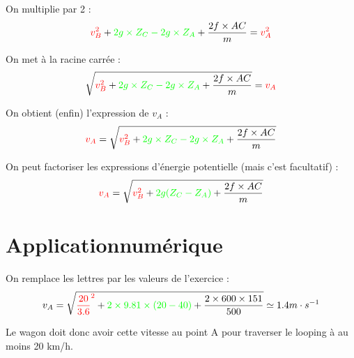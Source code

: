 \documentclass[a4paper,twoside,10pt,french]{scrartcl}
\begin{document}
On multiplie par 2 : $${\color{red}v_B^2} + {\color{green}2g \times Z_C - 2g \times Z_A} + \frac{2f \times AC}{m} = {\color{red}v_A^2}$$

On met à la racine carrée : $$\sqrt{{\color{red}v_B^2} + {\color{green}2g \times Z_C - 2g \times Z_A} + \frac{2f \times AC}{m}} = {\color{red}v_A}$$

On obtient (enfin) l'expression de $v_A$ : $${\color{red}v_A} = \sqrt{{\color{red}v_B^2} + {\color{green}2g \times Z_C - 2g \times Z_A} + \frac{2f \times AC}{m}}$$

On peut factoriser les expressions d'énergie potentielle (mais c'est facultatif) : $${\color{red}v_A} = \sqrt{{\color{red}v_B^2} + {\color{green}2g (Z_C - Z_A)} + \frac{2f \times AC}{m}}$$
\section{Application\:numérique}

On remplace les lettres par les valeurs de l'exercice : $$v_A = \sqrt{{\color{red}\frac{20}{3.6}^2} + {\color{green}2 \times 9.81 \times (20 - 40)} + \frac{2 \times 600 \times 151}{500}} \simeq 1.4 m \cdot s^{-1}$$

Le wagon doit donc avoir cette vitesse au point A pour traverser le looping à au moins 20 km/h.
\end{document}
